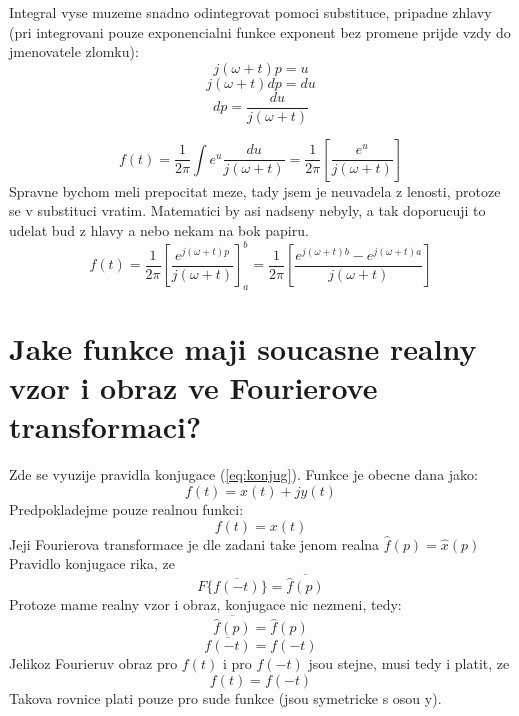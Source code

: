Integral vyse muzeme snadno odintegrovat pomoci substituce, pripadne zhlavy (pri integrovani pouze exponencialni funkce exponent bez promene prijde vzdy do jmenovatele zlomku):
$$j(\omega+t)p = u$$
$$j(\omega+t)dp = du$$ 
$$dp = \frac{du}{j(\omega+t)}$$

$$f(t) = \frac{1}{2\pi} \int e^u \frac{du}{j(\omega+t)} = \frac{1}{2\pi} \left[ \frac{e^u}{j(\omega+t)}\right]$$
Spravne bychom meli prepocitat meze, tady jsem je neuvadela z lenosti, protoze se v substituci vratim. Matematici by asi nadseny nebyly, a tak doporucuji to udelat bud z hlavy a nebo nekam na bok papiru. 
$$f(t) = \frac{1}{2\pi} \left[ \frac{e^{j(\omega +t)p}}{j(\omega +t)}\right]_a^b = \frac{1}{2\pi} \left[ \frac{e^{j(\omega +t)b}-e^{j(\omega +t)a}}{j(\omega +t)}\right]$$

\newpage

\section{Jake funkce maji soucasne realny vzor i obraz ve Fourierove transformaci?}

Zde se vyuzije pravidla konjugace (\ref{eq:konjug}). Funkce je obecne dana jako:
$$f(t) = x(t)+jy(t)$$
Predpokladejme pouze realnou funkci:
$$f(t) = x(t)$$
Jeji Fourierova transformace je dle zadani take jenom realna $\hat{f}(p) = \hat{x}(p)$
Pravidlo konjugace rika, ze 
$$F\{\overline{f(-t)}\} = \overline{\hat{f}(p)}$$
Protoze mame realny vzor i obraz, konjugace nic nezmeni, tedy:
$$\overline{\hat{f}(p)} = \hat{f}(p)$$
$$\overline{f(-t)} = f(-t)$$
Jelikoz Fourieruv obraz pro $f(t)$ i pro $f(-t)$ jsou stejne, musi tedy i platit, ze
$$f(t) = f(-t)$$
Takova rovnice plati pouze pro sude funkce (jsou symetricke s osou y).










